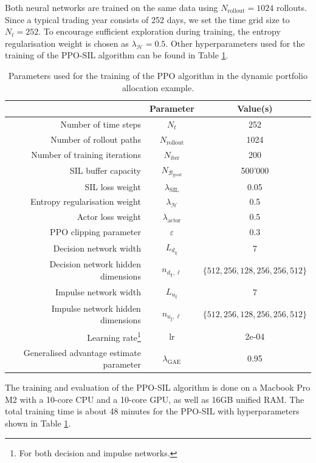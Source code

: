 Both neural networks are trained on the same data using $N_{\text{rollout}}=1024$ rollouts. Since a typical trading year consists of 252 days, we set the time grid size to $N_t=252$. To encourage sufficient exploration during training, the entropy regularisation weight is chosen as $\lambda_\mathcal{H}=0.5$. Other hyperparameters used for the training of the PPO-SIL algorithm can be found in Table \ref{tab: PPO training parameters pfolio}.
\begin{table}[!htbp]
    \centering
    \begin{tabular}{rcc}
        \toprule
        & Parameter & Value(s) \\
        \hline
        Number of time steps & $N_t$ & 252 \\
        Number of rollout paths & $N_\text{rollout}$ & 1024 \\
        Number of training iterations & $N_\text{iter}$ & 200 \\
        SIL buffer capacity & $N_{\mathcal{B}_\text{good}}$ & 500'000 \\
        SIL loss weight & $\lambda_{\text{SIL}}$ & 0.05 \\
        Entropy regularisation weight & $\lambda_{\mathcal{H}}$ & 0.5 \\
        Actor loss weight & $\lambda_{\text{actor}}$ & 0.5 \\
        PPO clipping parameter & $\varepsilon$ & 0.3 \\
        Decision network width & $L_{d_\chi}$ & 7 \\
        Decision network hidden dimensions & $n_{d_\chi, \ell}$ & $\{512, 256, 128, 256, 256, 512\}$ \\
        Impulse network width & $L_{u_\xi}$ & 7 \\
        Impulse network hidden dimensions & $n_{u_\xi, \ell}$ & $\{512, 256, 128, 256, 256, 512\}$ \\
        Learning rate\footnote{For both decision and impulse networks.} & lr & 2e-04 \\
        Generalised advantage estimate parameter & $\lambda_\text{GAE}$ & 0.95\\
        \toprule
    \end{tabular}
    \caption{Parameters used for the training of the PPO algorithm in the dynamic portfolio allocation example.}
    \label{tab: PPO training parameters pfolio}
\end{table}
The training and evaluation of the PPO-SIL algorithm is done on a Macbook Pro M2 with a 10-core CPU and a 10-core GPU, as well as 16GB unified RAM. The total training time is about 48 minutes for the PPO-SIL with hyperparameters shown in Table \ref{tab: PPO training parameters pfolio}.

